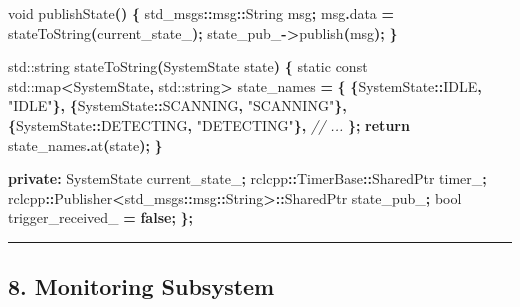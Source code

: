 \documentclass[
]{article}
\newenvironment{Shaded}{\begin{snugshade}}{\end{snugshade}}
\newcommand{\AttributeTok}[1]{\textcolor[rgb]{0.13,0.29,0.53}{#1}}
\newcommand{\BuiltInTok}[1]{#1}
\newcommand{\CommentTok}[1]{\textcolor[rgb]{0.56,0.35,0.01}{\textit{#1}}}
\newcommand{\ControlFlowTok}[1]{\textcolor[rgb]{0.13,0.29,0.53}{\textbf{#1}}}
\newcommand{\DataTypeTok}[1]{\textcolor[rgb]{0.13,0.29,0.53}{#1}}
\newcommand{\KeywordTok}[1]{\textcolor[rgb]{0.13,0.29,0.53}{\textbf{#1}}}
\newcommand{\NormalTok}[1]{#1}
\newcommand{\OperatorTok}[1]{\textcolor[rgb]{0.81,0.36,0.00}{\textbf{#1}}}
\newcommand{\StringTok}[1]{\textcolor[rgb]{0.31,0.60,0.02}{#1}}
\newcommand{\VariableTok}[1]{\textcolor[rgb]{0.00,0.00,0.00}{#1}}
\begin{document}
\begin{Shaded}
\begin{Highlighting}[]
    \DataTypeTok{void}\NormalTok{ publishState}\OperatorTok{()} \OperatorTok{\{}
\NormalTok{        std\_msgs}\OperatorTok{::}\NormalTok{msg}\OperatorTok{::}\NormalTok{String msg}\OperatorTok{;}
\NormalTok{        msg}\OperatorTok{.}\NormalTok{data }\OperatorTok{=}\NormalTok{ stateToString}\OperatorTok{(}\VariableTok{current\_state\_}\OperatorTok{);}
        \VariableTok{state\_pub\_}\OperatorTok{{-}\textgreater{}}\NormalTok{publish}\OperatorTok{(}\NormalTok{msg}\OperatorTok{);}
    \OperatorTok{\}}

    \BuiltInTok{std::}\NormalTok{string stateToString}\OperatorTok{(}\NormalTok{SystemState state}\OperatorTok{)} \OperatorTok{\{}
        \AttributeTok{static} \AttributeTok{const} \BuiltInTok{std::}\NormalTok{map}\OperatorTok{\textless{}}\NormalTok{SystemState}\OperatorTok{,} \BuiltInTok{std::}\NormalTok{string}\OperatorTok{\textgreater{}}\NormalTok{ state\_names }\OperatorTok{=} \OperatorTok{\{}
            \OperatorTok{\{}\NormalTok{SystemState}\OperatorTok{::}\NormalTok{IDLE}\OperatorTok{,} \StringTok{"IDLE"}\OperatorTok{\},}
            \OperatorTok{\{}\NormalTok{SystemState}\OperatorTok{::}\NormalTok{SCANNING}\OperatorTok{,} \StringTok{"SCANNING"}\OperatorTok{\},}
            \OperatorTok{\{}\NormalTok{SystemState}\OperatorTok{::}\NormalTok{DETECTING}\OperatorTok{,} \StringTok{"DETECTING"}\OperatorTok{\},}
            \CommentTok{// ...}
        \OperatorTok{\};}
        \ControlFlowTok{return}\NormalTok{ state\_names}\OperatorTok{.}\NormalTok{at}\OperatorTok{(}\NormalTok{state}\OperatorTok{);}
    \OperatorTok{\}}

\KeywordTok{private}\OperatorTok{:}
\NormalTok{    SystemState }\VariableTok{current\_state\_}\OperatorTok{;}
\NormalTok{    rclcpp}\OperatorTok{::}\NormalTok{TimerBase}\OperatorTok{::}\NormalTok{SharedPtr }\VariableTok{timer\_}\OperatorTok{;}
\NormalTok{    rclcpp}\OperatorTok{::}\NormalTok{Publisher}\OperatorTok{\textless{}}\NormalTok{std\_msgs}\OperatorTok{::}\NormalTok{msg}\OperatorTok{::}\NormalTok{String}\OperatorTok{\textgreater{}::}\NormalTok{SharedPtr }\VariableTok{state\_pub\_}\OperatorTok{;}
    \DataTypeTok{bool} \VariableTok{trigger\_received\_} \OperatorTok{=} \KeywordTok{false}\OperatorTok{;}
\OperatorTok{\};}
\end{Highlighting}
\end{Shaded}

\begin{center}\rule{0.5\linewidth}{0.5pt}\end{center}

\hypertarget{monitoring-subsystem}{%
\subsection{8. Monitoring Subsystem}\label{monitoring-subsystem}}
\end{document}
